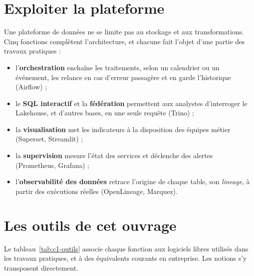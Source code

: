 \section{Exploiter la plateforme}

Une plateforme de données ne se limite pas au stockage et aux transformations. Cinq fonctions
complètent l'architecture, et chacune fait l'objet d'une partie des travaux pratiques :
\begin{itemize}[leftmargin=*,itemsep=2pt]
  \item l'\textbf{orchestration} enchaîne les traitements, selon un calendrier
        ou un événement, les relance en cas d'erreur passagère et en garde l'historique (Airflow) ;
  \item le \textbf{SQL interactif} et la \textbf{fédération} permettent aux analystes d'interroger
        le Lakehouse, et d'autres bases, en une seule requête (Trino) ;
  \item la \textbf{visualisation} met les indicateurs à la disposition des équipes métier (Superset,
        Streamlit) ;
  \item la \textbf{supervision} mesure l'état des services et déclenche des alertes (Prometheus,
        Grafana) ;
  \item l'\textbf{observabilité des données} retrace l'origine de chaque table, son
        \emph{lineage}, à partir des exécutions réelles (OpenLineage, Marquez).
\end{itemize}

\section{Les outils de cet ouvrage}

Le tableau~\ref{tab:c1-outils} associe chaque fonction aux logiciels libres utilisés dans les
travaux pratiques, et à des équivalents courants en entreprise. Les notions s'y transposent
directement.

